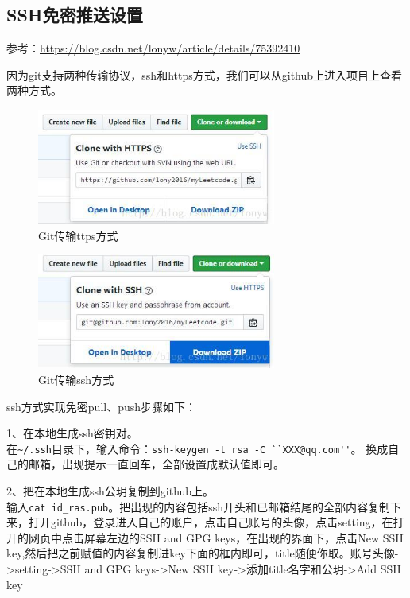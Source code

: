 \subsection{SSH免密推送设置}
参考：\url{https://blog.csdn.net/lonyw/article/details/75392410}

因为git支持两种传输协议，ssh和https方式，我们可以从github上进入项目上查看两种方式。
\begin{figure}[h!]
\centering
\includegraphics[width=0.7\textwidth]{pictures/20170719225827865.jpeg}
\caption{Git传输ttps方式}
\end{figure}

\begin{figure}[h!]
\centering
\includegraphics[width=0.7\textwidth]{pictures/20170719225703754.jpeg}
\caption{Git传输ssh方式}
\label{fig:g239}
\end{figure}

ssh方式实现免密pull、push步骤如下：

1、在本地生成ssh密钥对。\\
在\verb|~/.ssh|目录下，输入命令：\verb|ssh-keygen -t rsa -C ``XXX@qq.com''|。
换成自己的邮箱，出现提示一直回车，全部设置成默认值即可。

2、把在本地生成ssh公玥复制到github上。\\
输入\verb|cat id_ras.pub|。把出现的内容包括ssh开头和已邮箱结尾的全部内容复制下来，打开github，登录进入自己的账户，点击自己账号的头像，点击setting，在打开的网页中点击屏幕左边的SSH and GPG keys，在出现的界面下，点击New SSH key,然后把之前赋值的内容复制进key下面的框内即可，title随便你取。账号头像->setting->SSH and GPG keys->New SSH key->添加title名字和公玥->Add SSH key

